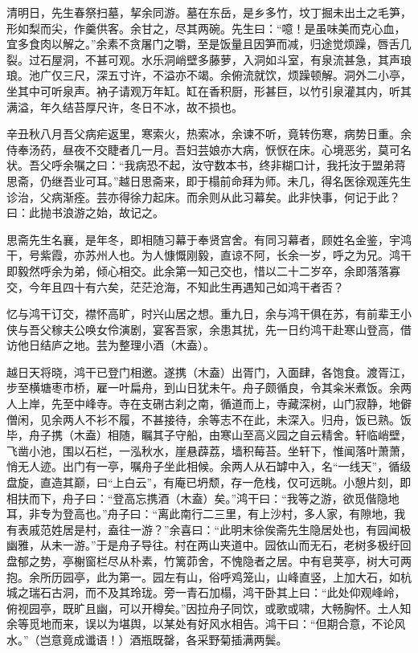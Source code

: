 \documentclass[]{article}
\begin{document}
清明日，先生春祭扫墓，挈余同游。墓在东岳，是乡多竹，坟丁掘未出土之毛笋，形如梨而尖，作羹供客。余甘之，尽其两碗。先生曰：``噫！是虽味美而克心血，宜多食肉以解之。''余素不贪屠门之嚼，至是饭量且因笋而减，归途觉烦躁，唇舌几裂。过石屋洞，不甚可观。水乐洞峭壁多藤萝，入洞如斗室，有泉流甚急，其声琅琅。池广仅三尺，深五寸许，不溢亦不竭。余俯流就饮，烦躁顿解。洞外二小亭，坐其中可听泉声。衲子请观万年缸。缸在香积厨，形甚巨，以竹引泉灌其内，听其满溢，年久结苔厚尺许，冬日不冰，故不损也。

辛丑秋八月吾父病疟返里，寒索火，热索冰，余谏不听，竟转伤寒，病势日重。余侍奉汤药，昼夜不交睫者几一月。吾妇芸娘亦大病，恹恹在床。心境恶劣，莫可名状。吾父呼余嘱之曰：``我病恐不起，汝守数本书，终非糊口计，我托汝于盟弟蒋思斋，仍继吾业可耳。''越日思斋来，即于榻前命拜为师。未几，得名医徐观莲先生诊治，父病渐痊。芸亦得徐力起床。而余则从此习幕矣。此非快事，何记于此？曰：此抛书浪游之始，故记之。

思斋先生名襄，是年冬，即相随习幕于奉贤宫舍。有同习幕者，顾姓名金鉴，宇鸿干，号紫霞，亦苏州人也。为人慷慨刚毅，直谅不阿，长余一岁，呼之为兄。鸿干即毅然呼余为弟，倾心相交。此余第一知己交也，惜以二十二岁卒，余即落落寡交，今年且四十有六矣，茫茫沧海，不知此生再遇知己如鸿干者否？

忆与鸿干订交，襟怀高旷，时兴山居之想。重九日，余与鸿干俱在苏，有前辈王小侠与吾父稼夫公唤女伶演剧，宴客吾家，余患其扰，先一日约鸿干赴寒山登高，借访他日结庐之地。芸为整理小酒（木盍）。

越日天将晓，鸿干已登门相邀。遂携（木盍）出胥门，入面肆，各饱食。渡胥江，步至横塘枣市桥，雇一叶扁舟，到山日犹未午。舟子颇循良，令其籴米煮饭。余两人上岸，先至中峰寺。寺在支硎古刹之南，循道而上，寺藏深树，山门寂静，地僻僧闲，见余两人不衫不履，不甚接待，余等志不在此，未深入。归舟，饭已熟。饭毕，舟子携（木盍）相随，瞩其子守船，由寒山至高义园之自云精舍。轩临峭壁，飞凿小池，围以石栏，一泓秋水，崖悬薜荔，墙积莓苔。坐轩下，惟闻落叶萧萧，悄无人迹。出门有一亭，嘱舟子坐此相候。余两人从石罅中入，名``一线天''，循级盘旋，直造其巅，曰``上白云''，有庵已坍颓，存一危栈，仅可远眺。小憩片刻，即相扶而下，舟子曰：``登高忘携酒（木盍）矣。''鸿干曰：``我等之游，欲觅偕隐地耳，非专为登高也。''舟子曰：``离此南行二三里，有上沙村，多人家，有隙地，我有表戚范姓居是村，盍往一游？''余喜曰：``此明末徐俟斋先生隐居处也，有园闻极幽雅，从未一游。''于是舟子导往。村在两山夹道中。园依山而无石，老树多极纡回盘郁之势，亭榭窗栏尽从朴素，竹篱茆舍，不愧隐者之居。中有皂荚亭，树大可两抱。余所历园亭，此为第一。园左有山，俗呼鸡笼山，山峰直竖，上加大石，如杭城之瑞石古洞，而不及其玲珑。旁一青石加榻，鸿干卧其上曰：``此处仰观峰岭，俯视园亭，既旷且幽，可以开樽矣。''因拉舟子同饮，或歌或啸，大畅胸怀。土人知余等觅地而来，误以为堪舆，以某处有好风水相告。鸿干曰：``但期合意，不论风水。''（岂意竟成谶语！）酒瓶既罄，各采野菊插满两鬓。
\end{document}
